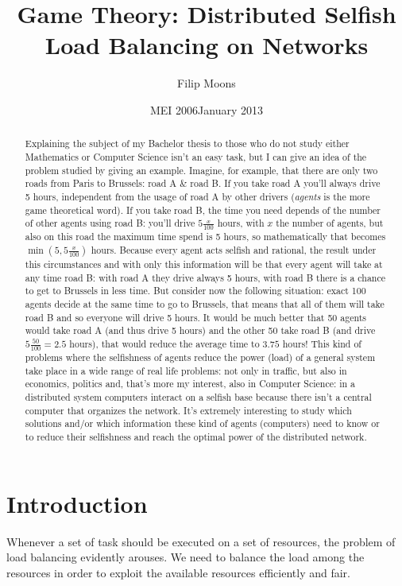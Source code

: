 \documentclass[a4paper,11pt]{article}
\author{Filip Moons}
\title{Game Theory: Distributed Selfish Load Balancing on Networks}
\date{MEI 2006}
\date{January 2013}
\begin{document}
\maketitlepage
\newpage
\null\vspace{\fill}

\begin{abstract}
Explaining the subject of my Bachelor thesis to those who do not study either Mathematics or Computer Science isn't an easy task, but I can give an idea of the problem studied by giving an example. Imagine, for example, that there are only two roads from Paris to Brussels: road A \& road B. If you take road A you'll always drive 5 hours, independent from the usage of road A by other drivers (\emph{agents} is the more game theoretical word). If you take road B, the time you need depends of the number of other agents using road B: you'll drive $5\frac{x}{100}$ hours, with $x$ the number of agents, but also on this road the maximum time spend is 5 hours, so mathematically that becomes $\min(5, 5\frac{x}{100})$ hours. Because every agent acts selfish and rational, the result under this circumstances and with only this information will be that every agent will take at any time road B: with road A they drive always 5 hours, with road B there is a chance to get to Brussels in less time. But consider now the following situation: exact 100 agents decide at the same time to go to Brussels, that means that all of them will take road B and so everyone will drive 5 hours. It would be much better that 50 agents would take road A (and thus drive 5 hours) and the other 50 take road B (and drive $5\frac{50}{100} = 2.5$ hours), that would reduce the average time to $3.75$ hours! This kind of problems where the selfishness of agents reduce the power (load) of a general system take place in a wide range of real life problems: not only in traffic, but also in economics, politics and, that's more my interest, also in Computer Science: in a distributed system computers interact on a selfish base because there isn't a central computer that organizes the network. It's extremely interesting to study which solutions and/or which information these kind of agents (computers) need to know or to reduce their selfishness and reach the optimal power of the distributed network.
\end{abstract}
\vspace{\fill}
\newpage

\tableofcontents
\newpage


\section{Introduction}
Whenever a set of task should be executed on a set of resources, the problem of load balancing evidently arouses. We need to balance the load among the resources in order to exploit the available resources efficiently and fair.
\end{document}
